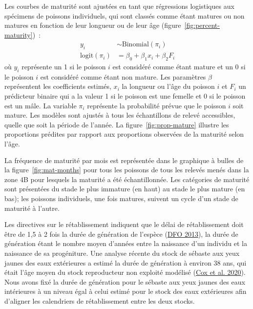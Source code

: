 \documentclass[french,11pt]{book}
\begin{document}
Les courbes de maturité sont ajustées en tant que régressions logistiques aux spécimens de poissons individuels, qui sont classés comme étant matures ou non matures en fonction de leur longueur ou de leur âge (figure~\ref{fig:percent-maturity})~:
\begin{align}
y_i &\sim \mathrm{Binomial}(\pi_i)\\
\mathrm{logit} \left( \pi_i \right) &= \beta_0 + \beta_1 x_i + \beta_2 F_i
\end{align}
où \(y_i\) représente un 1 si le poisson \(i\) est considéré comme étant mature et un 0 si le poisson \(i\) est considéré comme étant non mature. Les paramètres \(\beta\) représentent les coefficients estimés, \(x_i\) la longueur ou l'âge du poisson \(i\) et \(F_i\) un prédicteur binaire qui a la valeur 1 si le poisson est une femelle et 0 si le poisson est un mâle. La variable \(\pi_i\) représente la probabilité prévue que le poisson \(i\) soit mature. Les modèles sont ajustés à tous les échantillons de relevé accessibles, quelle que soit la période de l'année. La figure~\ref{fig:prop-mature} illustre les proportions prédites par rapport aux proportions observées de la maturité selon l'âge.



La fréquence de maturité par mois est représentée dans le graphique à bulles de la figure~\ref{fig:mat-months} pour tous les poissons de tous les relevés menés dans la zone 4B pour lesquels la maturité a été échantillonnée. Les catégories de maturité sont présentées du stade le plus immature (en haut) au stade le plus mature (en bas); les poissons individuels, une fois matures, suivent un cycle d'un stade de maturité à l'autre.

\hypertarget{sec:generation}{%
\label{sec:generation}}

Les directives sur le rétablissement indiquent que le délai de rétablissement doit être de 1,5 à 2 fois la durée de génération de l'espèce (\protect\hyperlink{ref-dfo2013}{DFO 2013}), la durée de génération étant le nombre moyen d'années entre la naissance d'un individu et la naissance de sa progéniture. Une analyse récente du stock de sébaste aux yeux jaunes des eaux extérieures a estimé la durée de génération à environ 38 ans, qui était l'âge moyen du stock reproducteur non exploité modélisé (\protect\hyperlink{ref-cox2020}{Cox et al. 2020}). Nous avons fixé la durée de génération pour le sébaste aux yeux jaunes des eaux intérieures à un niveau égal à celui estimé pour le stock des eaux extérieures afin d'aligner les calendriers de rétablissement entre les deux stocks.
\end{document}
